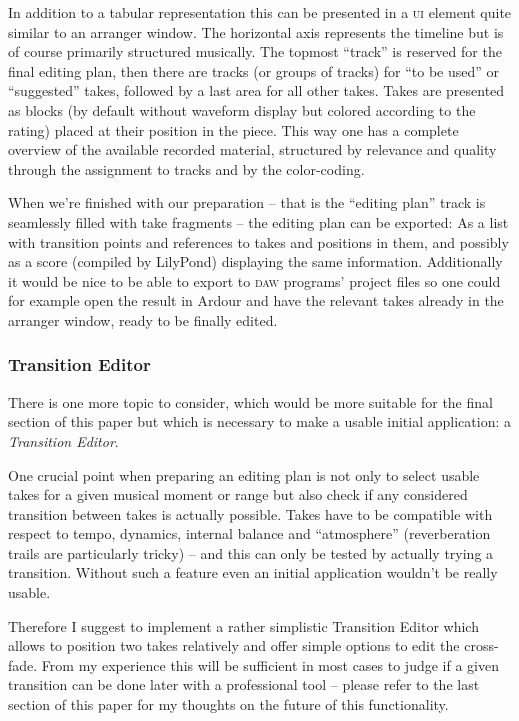 \documentclass[11pt,a4paper]{article}
\begin{document}
In addition to a tabular representation this can be presented in a \textsc{ui} element quite similar to an arranger window.
The horizontal axis represents the timeline but is of course primarily structured musically.
The topmost “track” is reserved for the final editing plan, then there are tracks (or groups of tracks) for “to be used” or “suggested” takes, followed by a last area for all other takes.
Takes are presented as blocks (by default without waveform display but colored according to the rating) placed at their position in the piece.
This way one has a complete overview of the available recorded material, structured by relevance and quality through the assignment to tracks and by the color-coding.

When we're finished with our preparation -- that is the “editing plan” track is seamlessly filled with take fragments -- the editing plan can be exported: As a list with transition points and references to takes and positions in them, and possibly as a score (compiled by LilyPond) displaying the same information.
Additionally it would be nice to be able to export to \textsc{daw} programs' project files so one could for example open the result in Ardour and have the relevant takes already in the arranger window, ready to be finally edited.

\subsubsection{Transition Editor}
There is one more topic to consider, which would be more suitable for the final section of this paper but which is necessary to make a usable initial application: a \emph{Transition Editor}.

One crucial point when preparing an editing plan is not only to select usable takes for a given musical moment or range but also check if any considered transition between takes is actually possible.
Takes have to be compatible with respect to tempo, dynamics, internal balance and “atmosphere” (reverberation trails are particularly tricky) -- and this can only be tested by actually trying a transition.
Without such a feature even an initial application wouldn't be really usable.

Therefore I suggest to implement a rather simplistic Transition Editor which allows to position two takes relatively and offer simple options to edit the cross-fade.
From my experience this will be sufficient in most cases to judge if a given transition can be done later with a professional tool -- please refer to the last section of this paper for my thoughts on the future of this functionality.
\end{document}
